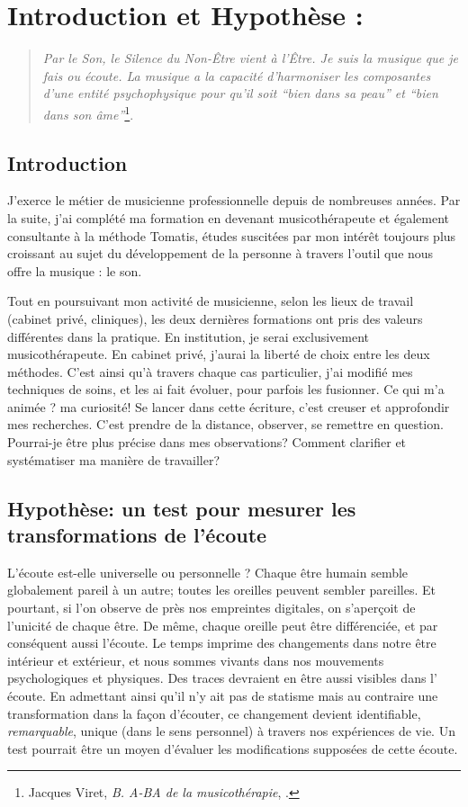 \chapter{Introduction et Hypothèse : }
\begin{quotation}
\emph{Par le Son, le Silence du Non-Être vient à l'Être. Je suis
la musique que je fais ou écoute. La musique a la capacité d'harmoniser
les composantes d'une entité psychophysique pour qu'il soit ``bien
dans sa peau'' et ``bien dans son âme''}\footnote{Jacques Viret, \emph{B. A-BA de la musicothérapie}, \cite{Viret2007}.}.
\end{quotation}
\section{Introduction}J'exerce le métier de musicienne professionnelle depuis de nombreuses
années. Par la suite, j'ai complété ma formation en devenant musicothérapeute et également consultante à la méthode Tomatis, études suscitées
par mon intérêt toujours plus croissant au sujet du développement de la personne
à travers l'outil que nous offre la musique : le son.



Tout en poursuivant mon activité de musicienne, selon les lieux de travail (cabinet privé, cliniques), les deux dernières formations ont pris des valeurs différentes dans la pratique. En institution, je serai exclusivement musicothérapeute. En cabinet
privé, j'aurai la liberté de choix entre les deux méthodes.
C'est ainsi qu'à travers chaque cas particulier,
j'ai modifié mes techniques de soins, et les ai fait évoluer,
pour parfois les fusionner. 
Ce qui m'a animée ? ma curiosité! Se lancer dans cette écriture, c'est creuser et approfondir mes recherches. C'est prendre de la distance, observer, se remettre en question.  Pourrai-je être plus précise dans mes observations? Comment clarifier et systématiser ma manière de travailler?


\section{Hypothèse: un test pour mesurer les transformations de l'écoute}

L'écoute est-elle universelle ou personnelle ? Chaque être humain semble  globalement pareil à un autre; toutes les oreilles peuvent sembler pareilles. Et pourtant, si l'on observe de près nos empreintes digitales, on s'aperçoit de l'unicité de chaque être. De même, chaque oreille peut être différenciée, et par conséquent aussi l'écoute. Le temps imprime des changements dans notre être intérieur et extérieur, et nous sommes vivants dans nos mouvements psychologiques et physiques. Des traces devraient en être aussi visibles dans l' écoute.
En admettant ainsi qu'il n'y ait pas de statisme mais au contraire une transformation dans la façon d'écouter, ce changement devient identifiable, \textit{remarquable}, unique (dans le sens personnel) à travers nos expériences de vie.  Un test pourrait être un moyen d'évaluer les modifications supposées de cette écoute. 


